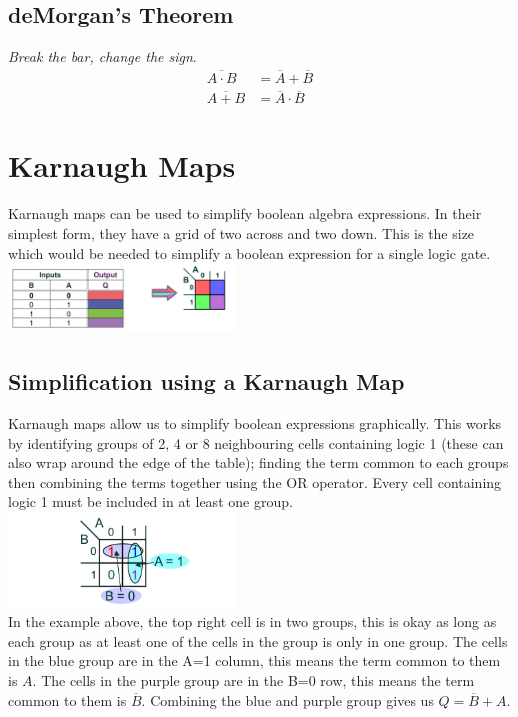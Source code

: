 \documentclass[a4paper,11pt, twocolumn]{article}
\begin{document}
\subsection{deMorgan's Theorem}
\textit{Break the bar, change the sign}.
\begin{align*}
    \overline{A\cdot B} &= \overline{A} + \overline{B}\\
    \overline{A+B} &= \overline{A}\cdot \overline{B}
\end{align*}

\section{Karnaugh Maps}
Karnaugh maps can be used to simplify boolean algebra expressions. In their simplest form, they have a grid of two across and two down. This is the size which would be needed to simplify a boolean expression for a single logic gate.\\
\includegraphics[width=0.45\textwidth]{kMaps1.PNG}\\
\subsection{Simplification using a Karnaugh Map}
Karnaugh maps allow us to simplify boolean expressions graphically. This works by identifying groups of 2, 4 or 8 neighbouring cells containing logic 1 (these can also wrap around the edge of the table); finding the term common to each groups then combining the terms together using the OR operator. Every cell containing logic 1 must be included in at least one group.
\includegraphics[width=0.45\textwidth]{kMaps2.PNG}\\
In the example above, the top right cell is in two groups, this is okay as long as each group as at least one of the cells in the group is only in one group. The cells in the blue group are in the A=1 column, this means the term common to them is $A$. The cells in the purple group are in the B=0 row, this means the term common to them is $\overline{B}$. Combining the blue and purple group gives us $Q=\overline{B} + A$.
\end{document}
